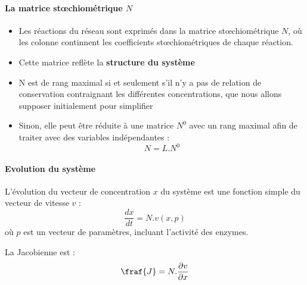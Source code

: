 \paragraph{La matrice stœchiométrique $N$}
\begin{itemize}
	\item Les réactions du réseau sont exprimés dans la matrice stœchiométrique $N$, où les colonne continnent les coefficients stœchiométriques de chaque réaction.
	\item Cette matrice reflète la \textbf{structure du système}
	\item N est de rang maximal si et seulement s'il n'y a pas de relation de conservation contraignant les différentes concentrations, que nous allons supposer initialement pour simplifier
	\item Sinon, elle peut être réduite à une matrice $N^0$ avec un rang maximal afin de traiter avec des variables indépendantes : $$ N=L.N^0 $$
\end{itemize}


\paragraph{Evolution du système}
L'évolution du vecteur de concentration $x$ du système est une fonction simple du vecteur de vitesse $v$ :
$$ \frac{dx}{dt}=N.v(x,p)$$ où $p$ est un vecteur de paramètres, incluant l'activité des enzymes.

La Jacobienne est :	$$ \fraf{J}  = N. \frac{ \partial v}{\partial x}     $$
















